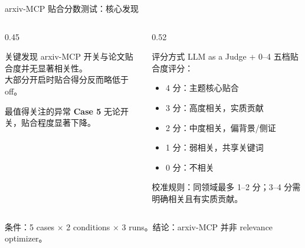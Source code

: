 \documentclass[UTF8,fontset=fandol,aspectratio=169]{ctexbeamer}
\begin{document}
\begin{frame}{arxiv-MCP 贴合分数测试：核心发现}
  \begin{columns}[T,onlytextwidth]
    \begin{column}{0.45\textwidth}
      \begin{alertblock}{关键发现}
        arxiv-MCP 开关与论文贴合度并无显著相关性。\\
        大部分开启时贴合得分反而略低于 off。
      \end{alertblock}
      \begin{block}{最值得关注的异常}
        \textbf{Case 5} 无论开关，贴合程度\alert{显著下降}。
      \end{block}
    \end{column}
    \begin{column}{0.52\textwidth}
      \begin{block}{评分方式}
        LLM as a Judge + 0--4 五档贴合度评分：
        \begin{itemize}
          \setlength{\itemsep}{2pt}
          \item 4 分：主题核心贴合
          \item 3 分：高度相关，实质贡献
          \item 2 分：中度相关，偏背景/侧证
          \item 1 分：弱相关，共享关键词
          \item 0 分：不相关
        \end{itemize}
        校准规则：同领域最多 1--2 分；3--4 分需明确相关且有实质贡献。
      \end{block}
    \end{column}
  \end{columns}

  \vspace{0.3em}
  条件：5 cases $\times$ 2 conditions $\times$ 3 runs。结论：arxiv-MCP 并非 relevance optimizer。
\end{frame}
\end{document}
